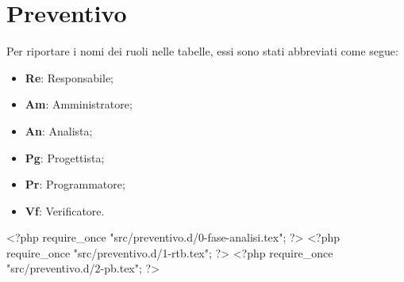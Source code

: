 \nonstopmode
\section{Preventivo}

Per riportare i nomi dei ruoli nelle tabelle, essi sono stati abbreviati come segue:

\begin{itemize}
\item \textbf{Re}: Responsabile;
\item \textbf{Am}: Amministratore;
\item \textbf{An}: Analista;
\item \textbf{Pg}: Progettista;
\item \textbf{Pr}: Programmatore;
\item \textbf{Vf}: Verificatore.
\end{itemize}

<?php require_once "src/preventivo.d/0-fase-analisi.tex"; ?>
<?php require_once "src/preventivo.d/1-rtb.tex"; ?>
<?php require_once "src/preventivo.d/2-pb.tex"; ?>
